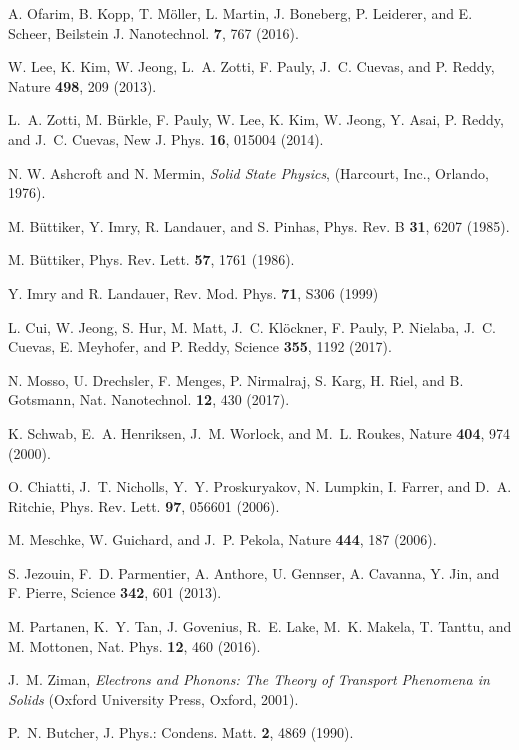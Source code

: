 \documentclass[aps,amsmath,amssymb,twocolumn,showpacs]{revtex4-1}
\begin{document}
\begin{thebibliography}{00}
A. Ofarim, B. Kopp, T. M\"oller, L. Martin, J. Boneberg, P. Leiderer, and E. Scheer,
Beilstein J. Nanotechnol. {\bf 7}, 767 (2016).

W. Lee, K. Kim, W. Jeong, L.~A. Zotti, F. Pauly, J.~C. Cuevas, and P. Reddy,
Nature {\bf 498}, 209 (2013).

L.~A. Zotti, M. B\"urkle, F. Pauly, W. Lee, K. Kim, W. Jeong, Y. Asai,
P. Reddy, and J.~C. Cuevas,
New J. Phys. {\bf 16}, 015004 (2014).

N. W. Ashcroft and N. Mermin, \emph{Solid State Physics}, (Harcourt, Inc., Orlando, 1976).

M. B\"uttiker, Y. Imry, R. Landauer, and S. Pinhas, Phys. Rev. B {\bf 31}, 6207 (1985).

M. B\"uttiker, Phys. Rev. Lett. {\bf 57}, 1761 (1986).

Y. Imry and R. Landauer, Rev. Mod. Phys. {\bf 71}, S306 (1999)

L. Cui, W. Jeong, S. Hur, M. Matt, J.~C. Kl\"ockner, F. Pauly, P. Nielaba, J.~C. Cuevas, 
E. Meyhofer, and P. Reddy, 
Science {\bf 355}, 1192 (2017).

N. Mosso, U. Drechsler, F. Menges, P. Nirmalraj, S. Karg, H. Riel, and B. Gotsmann,
Nat. Nanotechnol. {\bf 12}, 430 (2017).

K. Schwab, E.~A. Henriksen, J.~M. Worlock, and M.~L. Roukes, 
Nature {\bf 404}, 974 (2000).

O. Chiatti, J.~T. Nicholls, Y.~Y. Proskuryakov, N. Lumpkin, I. Farrer, and D.~A. Ritchie, 
Phys. Rev. Lett. {\bf 97}, 056601 (2006).

M. Meschke, W. Guichard, and J.~P. Pekola, 
Nature {\bf 444}, 187 (2006).

S. Jezouin, F.~D. Parmentier, A. Anthore, U. Gennser, A. Cavanna, Y. Jin, and F. Pierre, 
Science {\bf 342}, 601 (2013).

M. Partanen, K.~Y. Tan, J. Govenius, R.~E. Lake, M.~K. Makela, T. Tanttu, and M. Mottonen,
Nat. Phys. {\bf 12}, 460 (2016).

J.~M. Ziman, \emph{Electrons and Phonons: The Theory of Transport Phenomena in Solids}
(Oxford University Press, Oxford, 2001).

P.~N. Butcher, J. Phys.: Condens. Matt. {\bf 2}, 4869 (1990).


\end{thebibliography}
\end{document}
